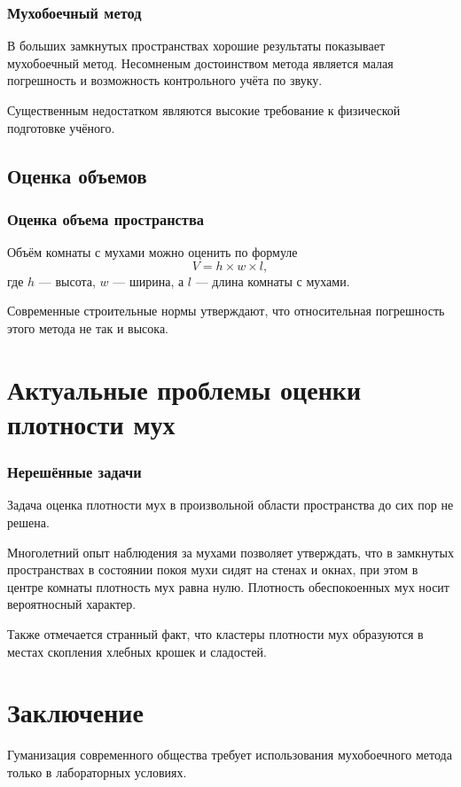     \begin{frame}
        \frametitle{Мухобоечный метод}
        
        В больших замкнутых пространствах хорошие результаты показывает мухобоечный метод. Несомненым достоинством метода является малая погрешность и возможность контрольного учёта по звуку.
    \end{frame}
    
    Существенным недостатком являются высокие требование к физической подготовке учёного.
    
    \subsection{Оценка объемов}
    
    \begin{frame}
        \frametitle{Оценка объема пространства}
        
        Объём комнаты с мухами можно оценить по формуле 
        \[V=h\times w\times l,\]
        где $h$ --- высота, $w$ --- ширина, а $l$ --- длина комнаты с мухами.
    \end{frame}
    
    Современные строительные нормы утверждают, что относительная погрешность этого метода не так и высока.
    
    \section{Актуальные проблемы оценки плотности мух}
    
    \begin{frame}
        \frametitle{Нерешённые задачи}
        
        Задача оценка плотности мух в произвольной области пространства до сих пор не решена.
    \end{frame}
    
    Многолетний опыт наблюдения за мухами позволяет утверждать, что в замкнутых пространствах в состоянии покоя мухи сидят на стенах и окнах, при этом в центре комнаты плотность мух равна нулю. Плотность обеспокоенных мух носит вероятносный характер.

    Также отмечается странный факт, что кластеры плотности мух образуются в местах скопления хлебных крошек и сладостей.
    
    \section{Заключение}
    Гуманизация современного общества требует использования мухобоечного метода только в лабораторных условиях.
